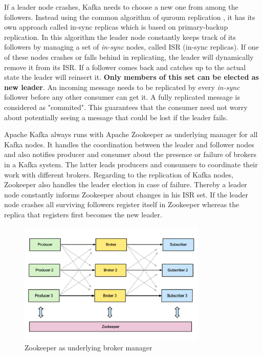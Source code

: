 
If a leader node crashes, Kafka needs to choose a new one from among the
followers. Instead using the common algorithm of quroum replication , it
has its own approach called in-sync replicas which is based on primary-backup
replication. In this algorithm the leader node
constantly keeps track of its followers by managing a set of \textit{in-sync}
nodes, called ISR (in-sync replicas). If one of these nodes crashes or falls
behind in replicating, the leader will dynamically remove it from its ISR. If a
follower comes back and catches up to the actual state the leader will reinsert
it. \textbf{Only members of this set can be elected as new leader}. An incoming
message needs to be replicated by every \textit{in-sync} follower before any
other consumer can get it. A fully replicated message is considered as
"commited". This guarantees that the consumer need not worry about potentially
seeing a message that could be lost if the leader fails. \cite{apachekafka}
\cite{kafka-wiki-replication}

Apache Kafka always runs with Apache Zookeeper  as underlying manager for all
Kafka nodes. It handles the coordination between the leader and follower nodes
and also notifies producer and consumer about the presence or failure of brokers in a
Kafka system. The latter leads producers and consumers to coordinate their work
with different brokers. Regarding to the replication of Kafka nodes, Zookeeper
also handles the leader election in case of failure. Thereby a leader node
constantly informs Zookeeper about changes in his ISR set. If the leader node
crashes all surviving followers register itself in Zookeeper whereas
the replica that registers first becomes the new leader.
\cite{kafka-wiki-replication} \cite{ArtKafkaInfoQ}

\begin{figure}[H]
    \centering
    \includegraphics[width=0.8\textwidth]{images/kafka-replication-zookeeper.png}
    \caption{Zookeeper as underlying broker manager \cite{ArtKafkaInfoQ}}
    \label{fig:the-log}
\end{figure}

